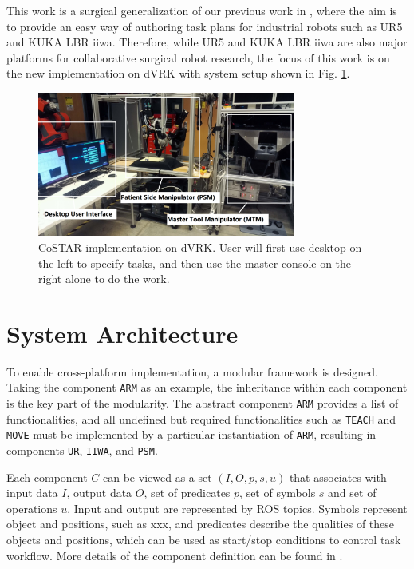 \documentclass[letterpaper, 10 pt, conference]{ieeeconf}
\begin{document}

This work is a surgical generalization of our previous work in \cite{paxton2017costar}, where the aim is to provide an easy way of authoring task plans for industrial robots such as UR5 and KUKA LBR iiwa. Therefore, while UR5 and KUKA LBR iiwa are also major platforms for collaborative surgical robot research, the focus of this work is on the new implementation on dVRK with system setup shown in Fig. \ref{fig:dvrk}. 


\begin{figure}[bt]
\centering
\includegraphics[width=240pt]{dvrk.png}
\caption{CoSTAR implementation on dVRK. User will first use desktop on the left to specify tasks, and then use the master console on the right alone to do the work.}
\label{fig:dvrk}
\end{figure}


\section{System Architecture}
To enable cross-platform implementation, a modular framework is designed. Taking the component \texttt{ARM} as an example, the inheritance within each component is the key part of the modularity. The abstract component \texttt{ARM} provides a list of functionalities, and all undefined but required functionalities such as \texttt{TEACH} and \texttt{MOVE} must be implemented by a particular instantiation of \texttt{ARM}, resulting in components \texttt{UR}, \texttt{IIWA}, and \texttt{PSM}. 

Each component $C$ can be viewed as a set $(I,O,p,s,u)$ that associates with input data $I$, output data $O$, set of predicates $p$, set of symbols $s$ and set of operations $u$. Input and output are represented by ROS topics. Symbols represent object and positions, such as xxx, and predicates describe the qualities of these objects and positions, which can be used as start/stop conditions to control task workflow. More details of the component definition can be found in \cite{paxton2017costar}.
\end{document}
